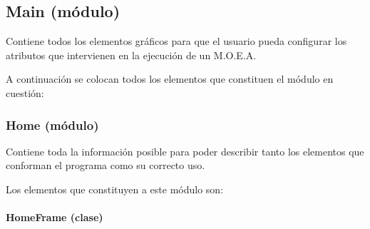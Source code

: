 \documentclass[letterpaper,10pt,english]{sphinxmanual}
\begin{document}
\subsection{Main (módulo)}
\label{View/Main/Main:main-modulo}\label{View/Main/Main::doc}
Contiene todos los elementos gráficos para que el usuario
pueda configurar los atributos que intervienen en la ejecución de un M.O.E.A.

A continuación se colocan todos los elementos que constituen el módulo en cuestión:


\subsubsection{Home (módulo)}
\label{View/Main/Home/Home::doc}\label{View/Main/Home/Home:home-modulo}
Contiene toda la información posible para poder describir tanto los elementos
que conforman el programa como su correcto uso.

Los elementos que constituyen a este módulo son:


\paragraph{HomeFrame (clase)}
\label{View/Main/Home/HomeFrame:module-View.Main.Home.HomeFrame}\label{View/Main/Home/HomeFrame::doc}\label{View/Main/Home/HomeFrame:homeframe-clase}
\end{document}
